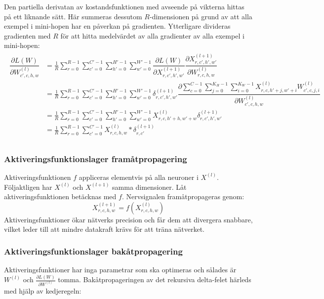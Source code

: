 \documentclass[a4paper,11pt,twoside]{article}
\newcommand*{\pd}[2]{\ensuremath{\dfrac{\partial #1}{\partial #2}}}
\newcommand*{\inpd}[2]{\ensuremath{\frac{\partial #1}{\partial #2}}}
\begin{document}
Den partiella derivatan av kostandsfunktionen med avseende på vikterna hittas på ett liknande sätt. Här summeras dessutom $R$-dimensionen på grund av att alla exempel i mini-hopen har en påverkan på gradienten. Ytterligare divideras gradienten med $R$ för att hitta medelvärdet av alla gradienter av alla exempel i mini-hopen: \cite{cs231n} \cite{webconv1} \cite{webconv2} \cite{webconv3} 
\begin{align}
\begin{split}
	\pd{L(W)}{W^{(l)}_{c',c,h,w}}
		& = \frac{1}{R}\sum^{R-1}_{r=0} \sum^{C'-1}_{c'=0} \sum^{H'-1}_{h'=0} \sum^{W'-1}_{w'=0} \pd{L(W)}{X^{(l+1)}_{r,c',h',w'}} \pd{X^{(l+1)}_{r,c',h',w'}}{W^{(l)}_{r,c,h,w}} \\
		& = \frac{1}{R}\sum^{R-1}_{r=0} \sum_{c'=0}^{C'-1} \sum^{H'-1}_{h'=0} \sum^{W'-1}_{w'=0} \delta^{(l+1)}_{r,c',h',w'} \pd{\sum\limits^{C-1}_{c=0} \sum\limits^{K_H-1}_{j=0} \sum\limits^{K_W-1}_{i=0} X^{(l)}_{r, c, h'+j, w'+i}W^{(l)}_{c', c, j, i}}{W^{(l)}_{c',c,h,w}} \\
		& = \frac{1}{R}\sum^{R-1}_{r=0} \sum^{C'-1}_{c'=0} \sum^{H'-1}_{h'=0} \sum^{W'-1}_{w'=0} X^{(l)}_{r, c, h'+h, w'+w} \delta^{(l+1)}_{r,c',h',w'} \\
		& = \frac{1}{R}\sum^{R-1}_{r=0} \sum^{C'-1}_{c'=0} X^{(l)}_{r, c, h, w} * \delta^{(l+1)}_{r,c'} \\
\end{split}
\end{align}

\subsubsection{Aktiveringsfunktionslager framåtpropagering}
Aktiveringsfunktionen $f$ appliceras elementvis på alla neuroner i $X^{(l)}$. Följaktligen har $X^{(l)}$ och $X^{(l+1)}$ samma dimensioner. Låt aktiveringsfunktionen betäcknas med $f$. Nervsignalen framåtpropageras genom: \cite{convmath}
\begin{equation}
X^{(l+1)}_{r,c,h,w} = f(X^{(l)}_{r,c,h,w})
\end{equation}
Aktiveringsfunktioner ökar nätverks precision och får dem att divergera snabbare, vilket leder till att mindre datakraft krävs för att träna nätverket. \cite{cs231n}

\subsubsection{Aktiveringsfunktionslager bakåtpropagering}
Aktiveringsfunktioner har inga parametrar som ska optimeras och sålades är $W^{(l)}$ och $\inpd{L(W)}{W^{(l)}}$ tomma. Bakåtpropageringen av det rekursiva delta-felet härleds med hjälp av kedjeregeln: \cite{cs231n} \cite{convmath}
\end{document}
